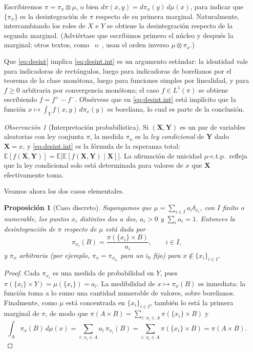 \documentclass[12pt, a4paper]{amsbook}
\newcommand{\E}{{\mathbb E}}
\newtheorem{prop}[teo]{Proposición}
\theoremstyle{remark}
\newtheorem{obs}[teo]{Observación}
\theoremstyle{definition}
\numberwithin{section}{chapter}
\numberwithin{subsection}{section}
\numberwithin{equation}{section}
\numberwithin{figure}{chapter}
\begin{document}
Escribiremos $\pi=\pi_x\otimes\mu$, o bien $d\pi(x,y)=d\pi_x(y)\,d\mu(x)$, para
indicar que $\{\pi_x\}$ es la desintegración de $\pi$ respecto de su primera
marginal. Naturalmente, intercambiando los roles de $X$ e $Y$ se obtiene la
desintegración respecto de la segunda marginal. (Adviértase que escribimos
primero el núcleo y después la marginal; otros textos, como~\cite{AGS2008}
o~\cite{Santambrogio}, usan el orden inverso $\mu\otimes\pi_x$.)

Que \eqref{eq:desint} implica \eqref{eq:desint.int} es un argumento estándar:
la identidad vale para indicadoras de rectángulos, luego para indicadoras de
borelianos por el teorema de la clase monótona, luego para funciones simples
por linealidad, y para $f\ge0$ arbitraria por convergencia monótona; el caso
$f\in L^1(\pi)$ se obtiene escribiendo $f=f^+-f^-$. Obsérvese que en
\eqref{eq:desint.int} está implícito que la función
$x\mapsto\int_Yf(x,y)\,d\pi_x(y)$ es boreliana, lo cual es parte de la
conclusión.

\begin{obs}[Interpretación probabilística]\label{obs.desint.prob}
Si $(\mathbf X,\mathbf Y)$ es un par de variables aleatorias con ley conjunta
$\pi$, la medida $\pi_x$ es la \emph{ley condicional} de $\mathbf Y$ dado
$\mathbf X=x$, y \eqref{eq:desint.int} es la fórmula de la esperanza total:
$\E[f(\mathbf X,\mathbf Y)]=\E\bigl[\E[f(\mathbf X,\mathbf Y)\mid\mathbf X]\bigr]$.
La afirmación de unicidad $\mu$-c.t.p.\ refleja que la ley condicional solo
está determinada para valores de $x$ que $\mathbf X$ efectivamente toma.
\end{obs}

Veamos ahora los dos casos elementales.

\begin{prop}[Caso discreto]\label{prop.desint.discreta}
Supongamos que $\mu=\sum_{i\in I}a_i\delta_{x_i}$, con $I$ finito o numerable,
los puntos $x_i$ distintos dos a dos, $a_i>0$ y $\sum_ia_i=1$. Entonces la desintegración de $\pi$ respecto de $\mu$
está dada por
\[
\pi_{x_i}(B)=\frac{\pi(\{x_i\}\times B)}{a_i},
\qquad i\in I,
\]
y $\pi_x$ arbitraria (por ejemplo, $\pi_x=\pi_{x_{i_0}}$ para un $i_0$ fijo)
para $x\notin\{x_i\}_{i\in I}$.
\end{prop}

\begin{proof}
Cada $\pi_{x_i}$ es una medida de probabilidad en $Y$, pues
$\pi(\{x_i\}\times Y)=\mu(\{x_i\})=a_i$. La medibilidad de $x\mapsto\pi_x(B)$
es inmediata: la función toma a lo sumo una cantidad numerable de valores,
sobre borelianos. Finalmente, como $\mu$ está concentrada en $\{x_i\}_{i\in I}$,
también lo está la primera marginal de $\pi$, de modo que
$\pi(A\times B)=\sum_{i:\,x_i\in A}\pi(\{x_i\}\times B)$ y
\[
\int_A\pi_x(B)\,d\mu(x)
=\sum_{i:\,x_i\in A}a_i\,\pi_{x_i}(B)
=\sum_{i:\,x_i\in A}\pi(\{x_i\}\times B)
=\pi(A\times B).
\]
\end{proof}
\end{document}
